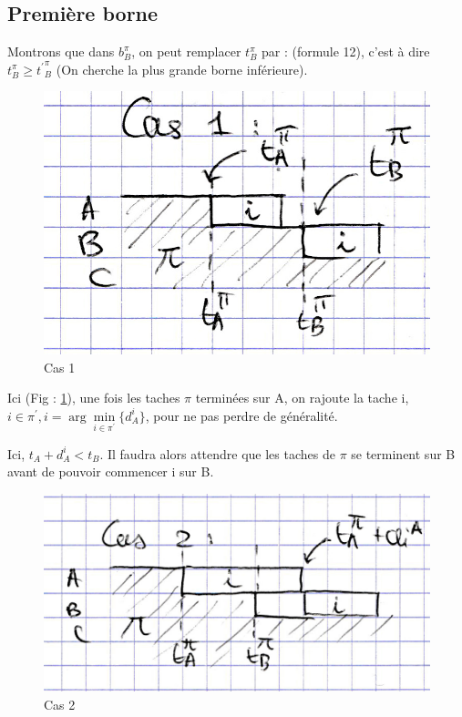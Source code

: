 \documentclass[12pt]{article}
\begin{document}
\subsection{Première borne}

Montrons que dans $b_B^\pi$, on peut remplacer $t_B^\pi$ par :
(formule 12), c'est à dire $t_B^\pi \ge {t^\prime}_B^\pi$ (On cherche la plus grande borne inférieure).

\begin{figure}[!ht]
\centering
\centerline{\includegraphics[scale=1]{5.jpg}}
\caption{Cas 1}
\label{cas11}
\end{figure}

Ici (Fig : \ref{cas11}), une fois les taches $\pi$ terminées sur A, on rajoute la tache i, $i\in{\pi}^\prime,i = {\arg\min\limits_{i\in{\pi^\prime}}}\{d_A^i\}$, pour ne pas perdre de généralité.

Ici, $t_A + d_A^i < t_B$. Il faudra alors attendre que les taches de $\pi$ se terminent sur B avant de pouvoir commencer i sur B.

\begin{figure}[!ht]
\centering
\centerline{\includegraphics[scale=1]{6.jpg}}
\caption{Cas 2}
\label{cas12}
\end{figure}
\end{document}
